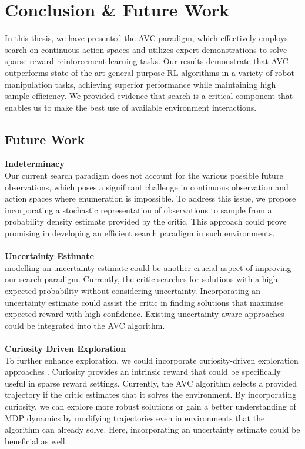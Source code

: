 
\chapter{Conclusion & Future Work}
\label{chapter:Conc_Fut}
In this thesis, we have presented the AVC paradigm, which effectively employs search on continuous action spaces and utilizes 
expert demonstrations to solve sparse reward reinforcement learning tasks. Our results demonstrate that AVC 
outperforms state-of-the-art general-purpose RL algorithms in a variety of robot manipulation tasks, achieving superior performance 
while maintaining high sample efficiency. We provided evidence that search is a critical component that enables us to make the best use of available 
environment interactions.

\section{Future Work}
\textbf{Indeterminacy}\\
Our current search paradigm does not account for the various possible future observations, which poses a significant challenge in 
continuous observation and action spaces where enumeration is impossible. To address this issue, we propose incorporating a stochastic 
representation of observations to sample from a probability density estimate provided by the critic. 
This approach could prove promising in developing an efficient search paradigm in such environments. \\ \\

\textbf{Uncertainty Estimate}\\
modelling an uncertainty estimate could be another crucial aspect of improving our search paradigm. 
Currently, the critic searches for solutions with a high expected probability without considering uncertainty. 
Incorporating an uncertainty estimate could assist the critic in finding solutions that maximise expected reward with high confidence. 
Existing uncertainty-aware approaches \cite{gawlikowski2022survey,liu2022simple} 
could be integrated into the AVC algorithm.\\ \\

\textbf{Curiosity Driven Exploration}\\
To further enhance exploration, we could incorporate curiosity-driven exploration approaches \cite{pathak2017curiositydriven}. 
Curiosity provides an intrinsic reward that could be specifically useful in sparse reward settings. 
Currently, the AVC algorithm selects a provided trajectory if the critic estimates that it solves the environment. By incorporating curiosity, 
we can explore more robust solutions or gain a better understanding of MDP dynamics by modifying trajectories even in environments that the 
algorithm can already solve. Here, incorporating an uncertainty estimate could be beneficial as well.